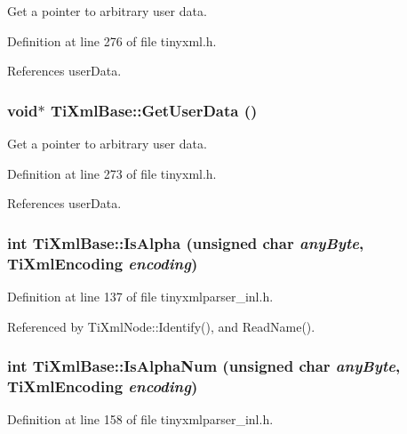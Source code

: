 Get a pointer to arbitrary user data. 

Definition at line 276 of file tinyxml.h.

References userData.\hypertarget{class_ti_xml_base_a6559a530ca6763fc301a14d77ed28c17}{
\subsubsection[{GetUserData}]{\setlength{\rightskip}{0pt plus 5cm}void$\ast$ TiXmlBase::GetUserData ()}}
\label{class_ti_xml_base_a6559a530ca6763fc301a14d77ed28c17}


Get a pointer to arbitrary user data. 

Definition at line 273 of file tinyxml.h.

References userData.\hypertarget{class_ti_xml_base_ae22522b2e8e1ac43102d16394f639fc8}{
\subsubsection[{IsAlpha}]{\setlength{\rightskip}{0pt plus 5cm}int TiXmlBase::IsAlpha (unsigned char {\em anyByte}, \/  {\bf TiXmlEncoding} {\em encoding})}}
\label{class_ti_xml_base_ae22522b2e8e1ac43102d16394f639fc8}


Definition at line 137 of file tinyxmlparser\_\-inl.h.

Referenced by TiXmlNode::Identify(), and ReadName().\hypertarget{class_ti_xml_base_a321919055c115c78ded17f85a793f368}{
\subsubsection[{IsAlphaNum}]{\setlength{\rightskip}{0pt plus 5cm}int TiXmlBase::IsAlphaNum (unsigned char {\em anyByte}, \/  {\bf TiXmlEncoding} {\em encoding})}}
\label{class_ti_xml_base_a321919055c115c78ded17f85a793f368}


Definition at line 158 of file tinyxmlparser\_\-inl.h.

